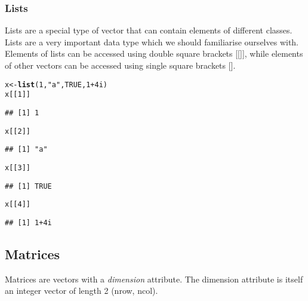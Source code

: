 \documentclass[10pt,a4paper,twoside]{article}\usepackage[]{graphicx}\usepackage[]{xcolor}
\makeatletter
\newcommand{\hlnum}[1]{\textcolor[rgb]{0.686,0.059,0.569}{#1}}%
\newcommand{\hlsng}[1]{\textcolor[rgb]{0.192,0.494,0.8}{#1}}%
\newcommand{\hlopt}[1]{\textcolor[rgb]{0,0,0}{#1}}%
\newcommand{\hldef}[1]{\textcolor[rgb]{0.345,0.345,0.345}{#1}}%
\newcommand{\hlkwb}[1]{\textcolor[rgb]{0.69,0.353,0.396}{#1}}%
\newcommand{\hlkwd}[1]{\textcolor[rgb]{0.737,0.353,0.396}{\textbf{#1}}}%
\newenvironment{kframe}{%
 \def\at@end@of@kframe{}%
 \ifinner\ifhmode%
  \def\at@end@of@kframe{\end{minipage}}%
  \begin{minipage}{\columnwidth}%
 \fi\fi%
 \def\FrameCommand##1{\hskip\@totalleftmargin \hskip-\fboxsep
 \colorbox{shadecolor}{##1}\hskip-\fboxsep
     \hskip-\linewidth \hskip-\@totalleftmargin \hskip\columnwidth}%
 \MakeFramed {\advance\hsize-\width
   \@totalleftmargin\z@ \linewidth\hsize
   \@setminipage}}%
 {\par\unskip\endMakeFramed%
 \at@end@of@kframe}
\newenvironment{knitrout}{}{} %
\makeatother
\begin{document}
\subsubsection{Lists}

Lists are a special type of vector that can contain elements of different classes. Lists are a very important data type which we should familiarise ourselves with. Elements of lists can be accessed using double square brackets [[]], while elements of other vectors can be accessed using single square brackets [].

\begin{knitrout}
\color{fgcolor}\begin{kframe}
\begin{alltt}
\hldef{x} \hlkwb{<-} \hlkwd{list}\hldef{(}\hlnum{1}\hldef{,} \hlsng{"a"}\hldef{,} \hlnum{TRUE}\hldef{,} \hlnum{1} \hlopt{+} \hlnum{4i}\hldef{)}
\hldef{x[[}\hlnum{1}\hldef{]]}
\end{alltt}
\begin{verbatim}
## [1] 1
\end{verbatim}
\begin{alltt}
\hldef{x[[}\hlnum{2}\hldef{]]}
\end{alltt}
\begin{verbatim}
## [1] "a"
\end{verbatim}
\begin{alltt}
\hldef{x[[}\hlnum{3}\hldef{]]}
\end{alltt}
\begin{verbatim}
## [1] TRUE
\end{verbatim}
\begin{alltt}
\hldef{x[[}\hlnum{4}\hldef{]]}
\end{alltt}
\begin{verbatim}
## [1] 1+4i
\end{verbatim}
\end{kframe}
\end{knitrout}

\subsection{Matrices}

Matrices are vectors with a \emph{dimension} attribute. The dimension attribute is itself an integer vector of length 2 (nrow, ncol).
\end{document}
